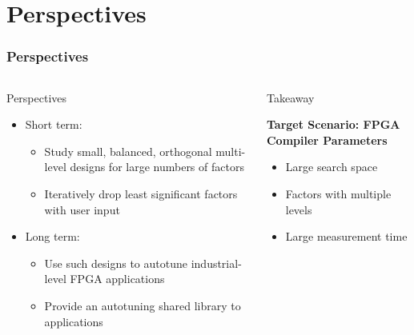\documentclass[10pt, compress, aspectratio=169, xcolor={table,usenames,dvipsnames}]{beamer}
\begin{document}
\section{Perspectives}

\begin{frame}
    \frametitle{Perspectives}
    \begin{columns}[c]
            \begin{block}{Perspectives}
                \begin{itemize}
                    \item \alert{Short term}:
                        \begin{itemize}
                            \item Study \alert{small}, \alert{balanced},
                                \alert{orthogonal} \alert{multi-level} designs
                                for \alert{large numbers of factors}
                            \item Iteratively \alert{drop least significant
                                factors} with \alert{user input}
                        \end{itemize}
                    \item \alert{Long term}:
                        \begin{itemize}
                            \item Use such designs to \alert{autotune
                                industrial-level FPGA applications}
                            \item Provide an \alert{autotuning shared library}
                                to applications
                        \end{itemize}
                \end{itemize}
            \end{block}

            \begin{block}{Takeaway}

                \vspace{.2cm}

                \textbf{Target Scenario: \alert{FPGA Compiler Parameters}}

                \vspace{-.1cm}

                \begin{itemize}
                    \item \alert{Large search space}
                    \item Factors with \alert{multiple levels}
                    \item \alert{Large measurement time}
                \end{itemize}


\end{block}
\end{columns}
\end{frame}
\end{document}
